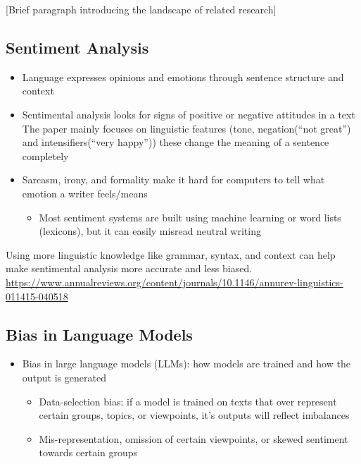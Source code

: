 
\label{sec:related}

[Brief paragraph introducing the landscape of related research]

\subsection{Sentiment Analysis}

\begin{itemize}
    \item Language expresses opinions and emotions through sentence structure and context
    \item Sentimental analysis looks for signs of positive or negative attitudes in a text
The paper mainly focuses on linguistic features (tone, negation(“not great”) and intensifiers(“very happy”)) these change the meaning of a sentence completely
    \item Sarcasm, irony, and formality make it hard for computers to tell what emotion a writer feels/means
    \begin{itemize}
        \item Most sentiment systems are built using machine learning or word lists (lexicons), but it can easily misread neutral writing
    \end{itemize}
\end{itemize}
Using more linguistic knowledge like grammar, syntax, and context can help make sentimental analysis more accurate and less biased. 
\url{https://www.annualreviews.org/content/journals/10.1146/annurev-linguistics-011415-040518 }
\cite{SentimentAnalysis}



\subsection{Bias in Language Models}

\begin{itemize}
    \item Bias in large language models (LLMs): how models are trained and how the output is generated
\begin{itemize}
    \item Data-selection bias: if a model is trained on texts that over represent certain groups, topics, or viewpoints, it’s outputs will reflect imbalances
    \item Mis-representation, omission of certain viewpoints, or skewed sentiment towards certain groups
\end{itemize}
\end{itemize}

